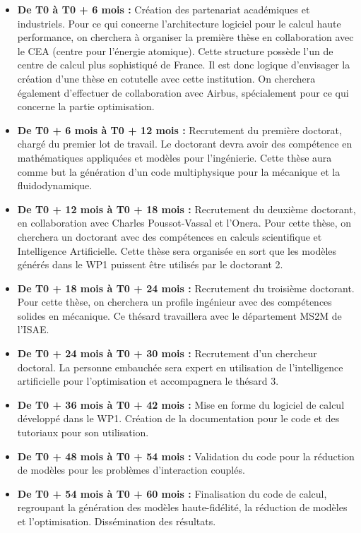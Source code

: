 \documentclass[12pt, french]{article}
\begin{document}
\begin{itemize}
	\item \textbf{De T0 à T0 + 6 mois :} Création des partenariat académiques et industriels.
	Pour ce qui concerne l'architecture logiciel pour le calcul haute performance, on cherchera à organiser la première thèse en collaboration avec le CEA (centre pour l'énergie atomique). Cette structure possède l'un de centre de calcul plus sophistiqué de France. Il est donc logique d'envisager la création d'une thèse en cotutelle avec cette institution. On cherchera également d'effectuer de collaboration avec Airbus, spécialement pour ce qui concerne la partie optimisation.
	\item \textbf{De T0 + 6 mois à T0 + 12 mois : } Recrutement du première doctorat, chargé du premier lot de travail. Le doctorant devra avoir des compétence en mathématiques appliquées et modèles pour l'ingénierie. Cette thèse aura comme but la génération d'un code multiphysique pour la mécanique et la fluidodynamique.
	\item \textbf{De T0 + 12 mois à T0 + 18 mois : } Recrutement du deuxième doctorant, en collaboration avec Charles Poussot-Vassal et l'Onera. Pour cette thèse, on cherchera un doctorant avec des compétences en calculs scientifique et Intelligence Artificielle. Cette thèse sera organisée en sort que les modèles générés dans le WP1 puissent être utilisés par le doctorant 2.
	\item \textbf{De T0 + 18 mois à T0 + 24 mois : } Recrutement du troisième doctorant. Pour cette thèse, on cherchera un profile ingénieur avec des compétences solides en mécanique. Ce thésard travaillera avec le département MS2M de l'ISAE.
	\item \textbf{De T0 + 24 mois à T0 + 30 mois : } Recrutement d'un chercheur doctoral. La personne embauchée sera expert en utilisation de l'intelligence artificielle pour l'optimisation et accompagnera le thésard 3. 
	\item \textbf{De T0 + 36 mois à T0 + 42 mois : } Mise en forme du logiciel de calcul développé dans le WP1. Création de la documentation pour le code et des tutoriaux pour son utilisation.
	\item \textbf{De T0 + 48 mois à T0 + 54 mois : } Validation du code pour la réduction de modèles pour les problèmes d'interaction couplés.
	\item \textbf{De T0 + 54 mois à T0 + 60 mois : } Finalisation du code de calcul, regroupant la génération des modèles haute-fidélité, la réduction de modèles et l'optimisation. Dissémination des résultats.
\end{itemize} 
\end{document}
